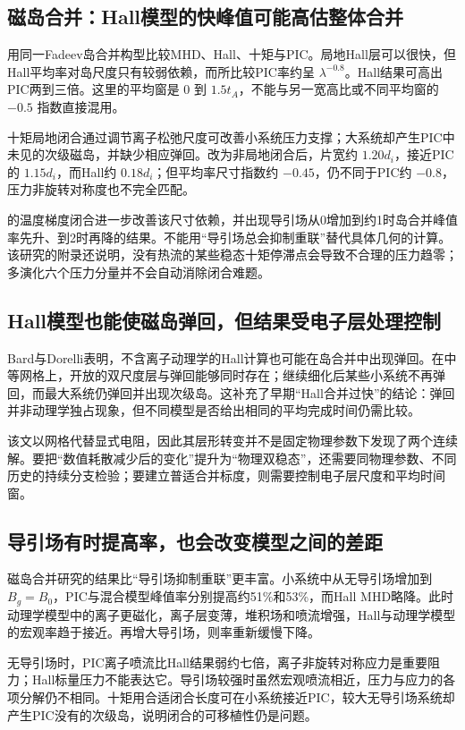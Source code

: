 \subsection{磁岛合并：Hall模型的快峰值可能高估整体合并}
\citet{Ng2015}用同一Fadeev岛合并构型比较MHD、Hall、十矩与PIC。局地Hall层可以很快，但Hall平均率对岛尺度只有较弱依赖，而所比较PIC率约呈 $\lambda^{-0.8}$。Hall结果可高出PIC两到三倍。这里的平均窗是 $0$ 到 $1.5t_A$，不能与另一宽高比或不同平均窗的 $-0.5$ 指数直接混用。

十矩局地闭合通过调节离子松弛尺度可改善小系统压力支撑；大系统却产生PIC中未见的次级磁岛，并缺少相应弹回。\citet{Ng2017}改为非局地闭合后，片宽约 $1.20d_i$，接近PIC的 $1.15d_i$，而Hall约 $0.18d_i$；但平均率尺寸指数约 $-0.45$，仍不同于PIC约 $-0.8$，压力非旋转对称度也不完全匹配。

\citet{Ng2020}的温度梯度闭合进一步改善该尺寸依赖，并出现导引场从0增加到约1时岛合并峰值率先升、到2时再降的结果。不能用“导引场总会抑制重联”替代具体几何的计算。该研究的附录还说明，没有热流的某些稳态十矩停滞点会导致不合理的压力趋零；多演化六个压力分量并不会自动消除闭合难题。

\subsection{Hall模型也能使磁岛弹回，但结果受电子层处理控制}
Bard与Dorelli表明，不含离子动理学的Hall计算也可能在岛合并中出现弹回。在中等网格上，开放的双尺度层与弹回能够同时存在；继续细化后某些小系统不再弹回，而最大系统仍弹回并出现次级岛。这补充了早期“Hall合并过快”的结论：弹回并非动理学独占现象，但不同模型是否给出相同的平均完成时间仍需比较。\citep{L251,Ng2015,Ng2017}

该文以网格代替显式电阻，因此其层形转变并不是固定物理参数下发现了两个连续解。要把“数值耗散减少后的变化”提升为“物理双稳态”，还需要同物理参数、不同历史的持续分支检验；要建立普适合并标度，则需要控制电子层尺度和平均时间窗。

\subsection{导引场有时提高率，也会改变模型之间的差距}
磁岛合并研究\citep{L241}的结果比“导引场抑制重联”更丰富。小系统中从无导引场增加到$B_g=B_0$，PIC与混合模型峰值率分别提高约51\%和53\%，而Hall MHD略降。此时动理学模型中的离子更磁化，离子层变薄，堆积场和喷流增强，Hall与动理学模型的宏观率趋于接近。再增大导引场，则率重新缓慢下降。

无导引场时，PIC离子喷流比Hall结果弱约七倍，离子非旋转对称应力是重要阻力；Hall标量压力不能表达它。导引场较强时虽然宏观喷流相近，压力与应力的各项分解仍不相同。十矩用合适闭合长度可在小系统接近PIC，较大无导引场系统却产生PIC没有的次级岛，说明闭合的可移植性仍是问题。

